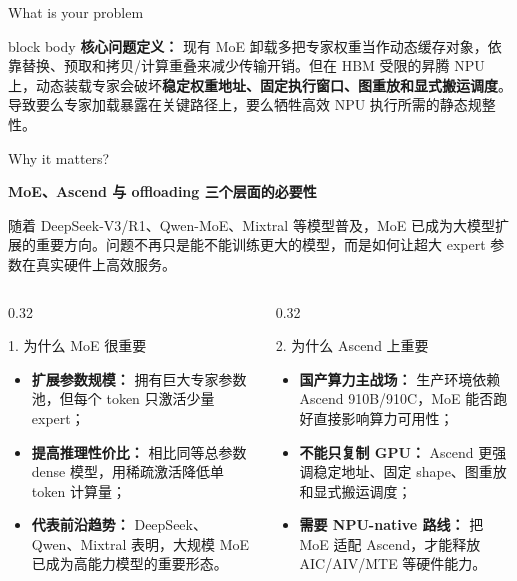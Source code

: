 \documentclass[aspectratio=169,10pt]{beamer}
\newcommand{\bluepoint}[1]{\textbf{\textcolor{MainBlue}{#1}}}
\begin{document}
\begin{frame}[t]{What is your problem}
\vspace{0.7em}
\begin{beamercolorbox}[wd=\linewidth,sep=0.45em,rounded=true]{block body}
\textbf{\textcolor{AccentRed}{核心问题定义：}}
现有 MoE 卸载多把专家权重当作动态缓存对象，依靠替换、预取和拷贝/计算重叠来减少传输开销。但在 HBM 受限的昇腾 NPU 上，动态装载专家会破坏\textbf{稳定权重地址、固定执行窗口、图重放和显式搬运调度}。导致要么专家加载暴露在关键路径上，要么牺牲高效 NPU 执行所需的静态规整性。
\end{beamercolorbox}
\end{frame}

\begin{frame}[t]{Why it matters?}
\footnotesize
\vspace{-0.4em}

\bluepoint{MoE、Ascend 与 offloading 三个层面的必要性}

\vspace{0.3em}
随着 DeepSeek-V3/R1、Qwen-MoE、Mixtral 等模型普及，MoE 已成为大模型扩展的重要方向。问题不再只是能不能训练更大的模型，而是如何让超大 expert 参数在真实硬件上高效服务。

\vspace{0.35em}

\begin{columns}[T,onlytextwidth]
\begin{column}{0.32\textwidth}
\begin{minipage}[t][0.34\textheight][t]{\linewidth}
\begin{block}{1. 为什么 MoE 很重要}
\scriptsize
\begin{itemize}
  \item \textbf{扩展参数规模：} 拥有巨大专家参数池，但每个 token 只激活少量 expert；
  \item \textbf{提高推理性价比：} 相比同等总参数 dense 模型，用稀疏激活降低单 token 计算量；
  \item \textbf{代表前沿趋势：} DeepSeek、Qwen、Mixtral 表明，大规模 MoE 已成为高能力模型的重要形态。
\end{itemize}
\end{block}
\end{minipage}
\end{column}

\begin{column}{0.32\textwidth}
\begin{minipage}[t][0.34\textheight][t]{\linewidth}
\begin{block}{2. 为什么 Ascend 上重要}
\scriptsize
\begin{itemize}
  \item \textbf{国产算力主战场：} 生产环境依赖 Ascend 910B/910C，MoE 能否跑好直接影响算力可用性；
  \item \textbf{不能只复制 GPU：} Ascend 更强调稳定地址、固定 shape、图重放和显式搬运调度；
  \item \textbf{需要 NPU-native 路线：} 把 MoE 适配 Ascend，才能释放 AIC/AIV/MTE 等硬件能力。
\end{itemize}
\end{block}
\end{minipage}
\end{column}


\end{columns}
\end{frame}
\end{document}
